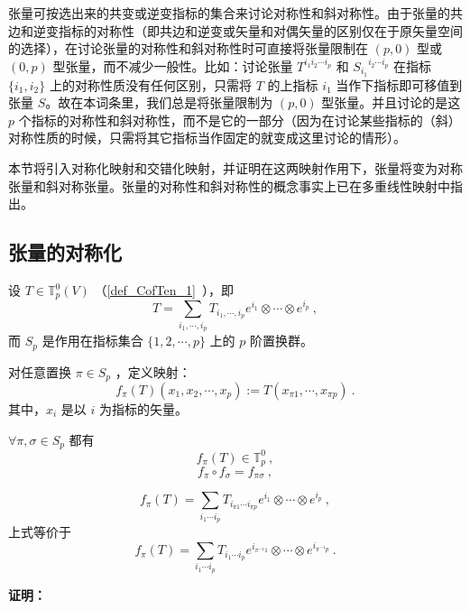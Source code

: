 


张量可按选出来的共变或逆变指标的集合来讨论对称性和斜对称性。由于张量的共边和逆变指标的对称性（即共边和逆变或矢量和对偶矢量的区别仅在于原矢量空间的选择），在讨论张量的对称性和斜对称性时可直接将张量限制在 $(p,0)$ 型或 $(0,p)$ 型张量，而不减少一般性。比如：讨论张量 $T^{i_1 i_2\cdots i_p}$ 和 ${S_{i_1}}^{i_2\cdots i_p}$ 在指标 $\{i_1,i_2\}$ 上的对称性质没有任何区别，只需将 $T$ 的上指标 $i_1$ 当作下指标即可移值到张量 $S$。故在本词条里，我们总是将张量限制为 $(p,0)$ 型张量。并且讨论的是这 $p$ 个指标的对称性和斜对称性，而不是它的一部分（因为在讨论某些指标的（斜）对称性质的时候，只需将其它指标当作固定的就变成这里讨论的情形）。

本节将引入对称化映射和交错化映射，并证明在这两映射作用下，张量将变为对称张量和斜对称张量。张量的对称性和斜对称性的概念事实上已在多重线性映射中指出。
\subsection{张量的对称化}
设 $T\in \mathbb{T}_p^0(V)$ （\autoref{def_CofTen_1}~），即
\begin{equation}
T=\sum_{i_1,\cdots,i_p}T_{i_1,\cdots,i_p}e^{i_1}\otimes\cdots\otimes e^{i_p}~,
\end{equation}
而 $S_p$ 是作用在指标集合 $\{1,2,\cdots,p\}$ 上的 $p$ 阶置换群。

对任意置换 $\pi\in S_p$ ，定义映射：
\begin{equation}\label{eq_SIofTe_1}
f_\pi(T)(x_1,x_2,\cdots,x_p):=T(x_{\pi1},\cdots,x_{\pi p})~.
\end{equation}
其中，$x_i$ 是以 $i$ 为指标的矢量。

\begin{theorem}{}
$\forall \pi,\sigma\in S_p$ 都有 
\begin{equation}
f_{\pi}(T)\in\mathbb{T}_p^0~,
\end{equation}
\begin{equation}\label{eq_SIofTe_6}
f_\pi \circ f_\sigma=f_{\pi\sigma}~,
\end{equation}

\begin{equation}\label{eq_SIofTe_2}
f_{\pi}(T)=\sum_{i_1\cdots i_p}T_{i_{\pi1}\cdots i_{\pi p}}e^{i_1}\otimes\cdots\otimes e^{i_p}~,
\end{equation}
上式等价于
\begin{equation}\label{eq_SIofTe_3}
f_{\pi}(T)=\sum_{i_1\cdots i_p}T_{i_1\cdots i_p}e^{i_{\pi^{-1}1}}\otimes\cdots\otimes e^{i_{\pi^{-1}p}}~.
\end{equation}
\end{theorem}
\textbf{证明：}

